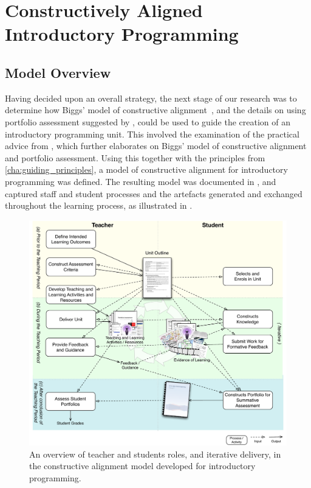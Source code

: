 
\clearpage
\section{Constructively Aligned Introductory Programming} %
\label{sec:a_constructively_aligned_model_for_introductory_programming}

\subsection{Model Overview} %
\label{sub:model_overview}

Having decided upon an overall strategy, the next stage of our research was to determine how Biggs' model of constructive alignment~\cite{Biggs:1996c}, and the details on using portfolio assessment suggested by \citet{Biggs:1997}, could be used to guide the creation of an introductory programming unit. This involved the examination of the practical advice from \citet{Biggs:2007}, which further elaborates on Biggs' model of constructive alignment and portfolio assessment. Using this together with the principles from \cref{cha:guiding_principles}, a model of constructive alignment for introductory programming was defined. The resulting model was documented in \citet{Cain:2012a}, and captured staff and student processes and the artefacts generated and exchanged throughout the learning process, as illustrated in .

\begin{figure}[htbp]
	\centering
	\includegraphics[width=\textwidth]{ProcessOverview}
	\caption{An overview of teacher and students roles, and iterative delivery, in the constructive alignment model developed for introductory programming.}
	\label{fig:process_overview}
\end{figure}

